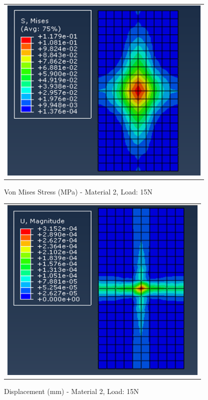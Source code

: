\documentclass[a4paper,12pt]{article}
\numberwithin{equation}{section}
\numberwithin{figure}{section}
\begin{document}
\begin{figure}[H]
  \centering
  \begin{tabular}{@{}c@{}}
    \includegraphics[width=0.7\linewidth,height=255pt]{Results/Point Loading/M2_VMS_L3.png} \\
  \end{tabular}
  \caption{Von Mises Stress (MPa) - Material 2, Load: 15N}
\end{figure}

\begin{figure}[H]
  \centering
  \begin{tabular}{@{}c@{}}
    \includegraphics[width=0.7\linewidth,height=255pt]{Results/Point Loading/M2_DIS_L3.png} \\
  \end{tabular}
  \caption{Displacement (mm) - Material 2, Load: 15N}
\end{figure}
\end{document}
